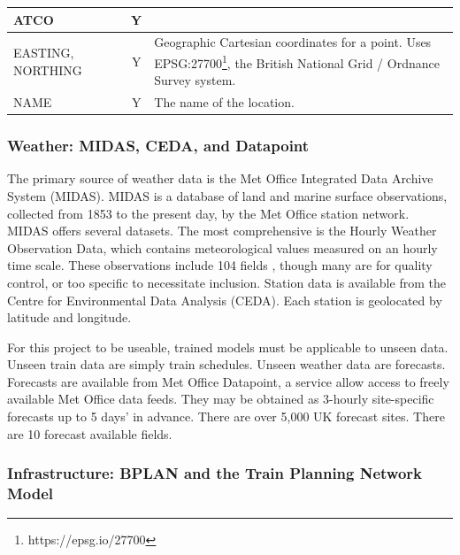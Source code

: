 \documentclass[12pt,a4paper]{article}
\begin{document}
\begin{table}[h!]
\begin{tabular}{|p{2.5cm}|c|c|p{8cm}|}
ATCO               &                                      & Y                                    &                                                                                                                                                                                     \\ \hline
EASTING, NORTHING  &                                      & Y                                    & Geographic Cartesian coordinates for a point. Uses EPSG:27700\footnote{https://epsg.io/27700}, the British National Grid / Ordnance Survey system.                                                                  \\ \hline
NAME               &                                      & Y                                    & The name of the location.                                                                                                                                                           \\ \hline
\end{tabular}
\end{table}

\subsubsection{Weather: MIDAS, CEDA, and Datapoint}

The primary source of weather data is the Met Office Integrated Data Archive System (MIDAS). MIDAS is a database of land and marine surface observations, collected from 1853 to the present day, by the Met Office station network. MIDAS offers several datasets. The most comprehensive is the Hourly Weather Observation Data, which contains meteorological values measured on an hourly time scale. These observations include 104 fields , though many are for quality control, or too specific to necessitate inclusion. Station data is available from the Centre for Environmental Data Analysis (CEDA). Each station is geolocated by latitude and longitude. 

For this project to be useable, trained models must be applicable to unseen data. Unseen train data are simply train schedules. Unseen weather data are forecasts. Forecasts are available from Met Office Datapoint, a service allow access to freely available Met Office data feeds. They may be obtained as 3-hourly site-specific forecasts up to 5 days’ in advance. There are over 5,000 UK forecast sites. There are 10 forecast available fields. 

\subsubsection{Infrastructure: BPLAN and the Train Planning Network Model}
\end{document}
